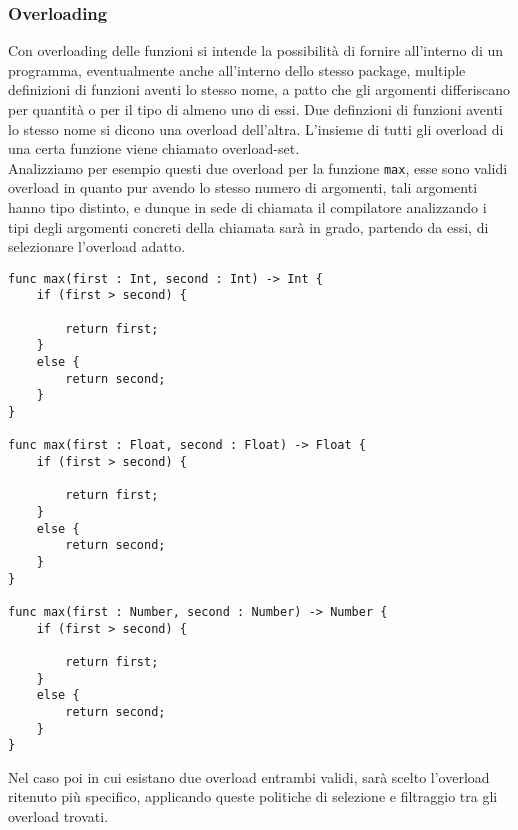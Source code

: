 \subsubsection{Overloading}
Con overloading delle funzioni si intende la possibilità di fornire all’interno 
di un programma, eventualmente anche all’interno dello stesso package, multiple 
definizioni di funzioni aventi lo stesso nome, a patto che gli argomenti differiscano 
per quantità o per il tipo di almeno uno di essi. Due definzioni di funzioni 
aventi lo stesso nome si dicono una overload dell’altra. L’insieme di tutti 
gli overload di una certa funzione viene chiamato overload-set. \\

Analizziamo per esempio questi due overload per la funzione \texttt{max}, esse sono 
validi overload in quanto pur avendo lo stesso numero di argomenti, tali 
argomenti hanno tipo distinto, e dunque in sede di chiamata il compilatore 
analizzando i tipi degli argomenti concreti della chiamata sarà in grado, 
partendo da essi, di selezionare l’overload adatto. \\

\vspace{0.5cm}
\begin{lstlisting}[frame=single]
func max(first : Int, second : Int) -> Int { 
    if (first > second) {

        return first; 
    }
    else {
        return second;
    }
}

func max(first : Float, second : Float) -> Float {
    if (first > second) {

        return first; 
    }
    else {
        return second;
    }
}

func max(first : Number, second : Number) -> Number {
    if (first > second) {

        return first; 
    }
    else {
        return second;
    }
}
\end{lstlisting}
\vspace{0.5cm}

\newpage

Nel caso poi in cui esistano due overload entrambi validi, sarà scelto l’overload ritenuto 
più specifico, applicando queste politiche di selezione e filtraggio tra gli overload trovati.

